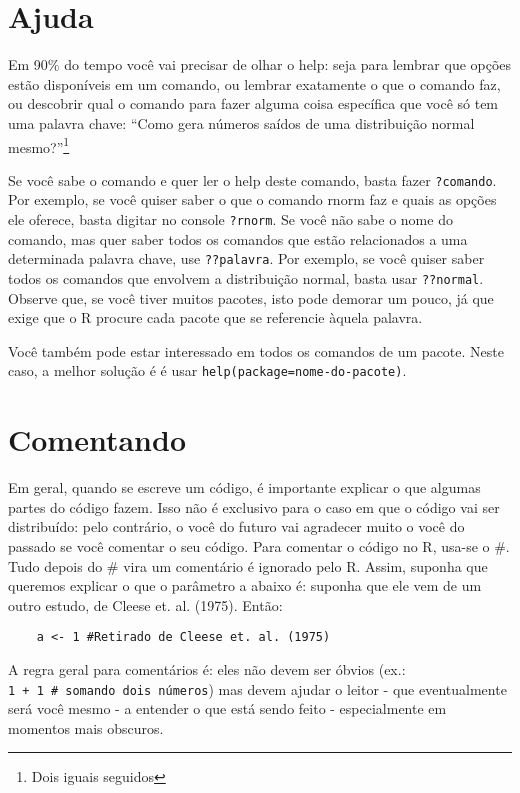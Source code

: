 \documentclass[]{book}
\let\rmarkdownfootnote\footnote%
\def\footnote{\protect\rmarkdownfootnote}
\begin{document}
\section{Ajuda}\label{ajuda}

Em 90\% do tempo você vai precisar de olhar o help: seja para lembrar
que opções estão disponíveis em um comando, ou lembrar exatamente o que
o comando faz, ou descobrir qual o comando para fazer alguma coisa
específica que você só tem uma palavra chave: ``Como gera números saídos
de uma distribuição normal mesmo?''\footnote{Dois iguais seguidos}

Se você sabe o comando e quer ler o help deste comando, basta fazer
\texttt{?comando}. Por exemplo, se você quiser saber o que o comando
rnorm faz e quais as opções ele oferece, basta digitar no console
\texttt{?rnorm}. Se você não sabe o nome do comando, mas quer saber
todos os comandos que estão relacionados a uma determinada palavra
chave, use \texttt{??palavra}. Por exemplo, se você quiser saber todos
os comandos que envolvem a distribuição normal, basta usar
\texttt{??normal}. Observe que, se você tiver muitos pacotes, isto pode
demorar um pouco, já que exige que o R procure cada pacote que se
referencie àquela palavra.

Você também pode estar interessado em todos os comandos de um pacote.
Neste caso, a melhor solução é é usar
\texttt{help(package=\textasciigrave{}\textasciigrave{}nome-do-pacote\textquotesingle{}\textquotesingle{})}.

\section{Comentando}\label{comentando}

Em geral, quando se escreve um código, é importante explicar o que
algumas partes do código fazem. Isso não é exclusivo para o caso em que
o código vai ser distribuído: pelo contrário, o você do futuro vai
agradecer muito o você do passado se você comentar o seu código. Para
comentar o código no R, usa-se o \#. Tudo depois do \# vira um
comentário é ignorado pelo R. Assim, suponha que queremos explicar o que
o parâmetro a abaixo é: suponha que ele vem de um outro estudo, de
Cleese et. al. (1975). Então:

\begin{verbatim}
    a <- 1 #Retirado de Cleese et. al. (1975)
\end{verbatim}

A regra geral para comentários é: eles não devem ser óbvios (ex.:
\texttt{1\ +\ 1\ \#\ somando\ dois\ números}) mas devem ajudar o leitor
- que eventualmente será você mesmo - a entender o que está sendo feito
- especialmente em momentos mais obscuros.
\end{document}
